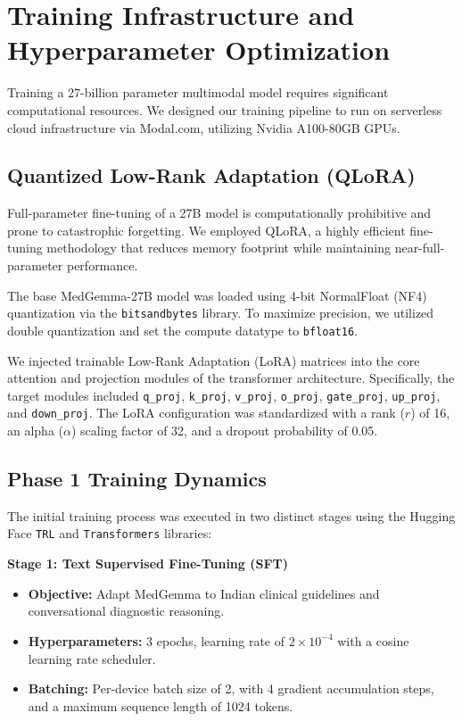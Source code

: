 \documentclass[11pt,a4paper]{article}
\begin{document}
\section{Training Infrastructure and Hyperparameter Optimization}

Training a 27-billion parameter multimodal model requires significant computational resources. We designed our training pipeline to run on serverless cloud infrastructure via Modal.com, utilizing Nvidia A100-80GB GPUs.

\subsection{Quantized Low-Rank Adaptation (QLoRA)}
Full-parameter fine-tuning of a 27B model is computationally prohibitive and prone to catastrophic forgetting. We employed QLoRA, a highly efficient fine-tuning methodology that reduces memory footprint while maintaining near-full-parameter performance. 

The base MedGemma-27B model was loaded using 4-bit NormalFloat (NF4) quantization via the \texttt{bitsandbytes} library. To maximize precision, we utilized double quantization and set the compute datatype to \texttt{bfloat16}. 

We injected trainable Low-Rank Adaptation (LoRA) matrices into the core attention and projection modules of the transformer architecture. Specifically, the target modules included \texttt{q\_proj}, \texttt{k\_proj}, \texttt{v\_proj}, \texttt{o\_proj}, \texttt{gate\_proj}, \texttt{up\_proj}, and \texttt{down\_proj}. The LoRA configuration was standardized with a rank ($r$) of 16, an alpha ($\alpha$) scaling factor of 32, and a dropout probability of 0.05.

\subsection{Phase 1 Training Dynamics}
The initial training process was executed in two distinct stages using the Hugging Face \texttt{TRL} and \texttt{Transformers} libraries:

\textbf{Stage 1: Text Supervised Fine-Tuning (SFT)}
\begin{itemize}
    \item \textbf{Objective:} Adapt MedGemma to Indian clinical guidelines and conversational diagnostic reasoning.
    \item \textbf{Hyperparameters:} 3 epochs, learning rate of $2\times 10^{-4}$ with a cosine learning rate scheduler.
    \item \textbf{Batching:} Per-device batch size of 2, with 4 gradient accumulation steps, and a maximum sequence length of 1024 tokens.
\end{itemize}
\end{document}
